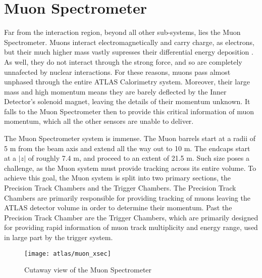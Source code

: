     


\section{Muon Spectrometer} \label{sec:muon}
    Far from the interaction region, beyond all other sub-systems, lies the Muon Spectrometer.
    Muons interact electromagnetically and carry charge, as electrons, but their much higher mass vastly supresses their differential energy deposition \cite{wiley_radiation_detection}.
    As well, they do not interact through the strong force, and so are completely unnafected by nuclear interactions.
    For these reasons, muons pass almost unphased through the entire ATLAS Calorimetry system.
    Moreover, their large mass and high momentum means they are barely deflected by the Inner Detector's solenoid magnet, leaving the details of their momentum unknown.
    It falls to the Muon Spectrometer then to provide this critical information of muon momentum, which all the other sensors are unable to deliver.

    The Muon Spectrometer system is immense.
    The Muon barrels start at a radii of 5 m from the beam axis and extend all the way out to 10 m.
    The endcaps start at a $|z|$ of roughly 7.4 m, and proceed to an extent of 21.5 m.
    Such size poses a challenge, as the Muon system must provide tracking across its entire volume.
    To achieve this goal, the Muon system is split into two primary sections, the Precision Track Chambers and the Trigger Chambers.
    The Precision Track Chambers are primarily responsible for providing tracking of muons leaving the ATLAS detector volume in order to determine their momentum.
    Past the Precision Track Chamber are the Trigger Chambers, which are primarily designed for providing rapid information of muon track multiplicity and energy range, used in large part by the trigger system.

    \begin{figure}
        \texttt{[image: atlas/muon\_xsec]}
        \caption{Cutaway view of the Muon Spectrometer \cite{atlas_tdr}}
        \label{fig:muon_xsec}
    \end{figure}

